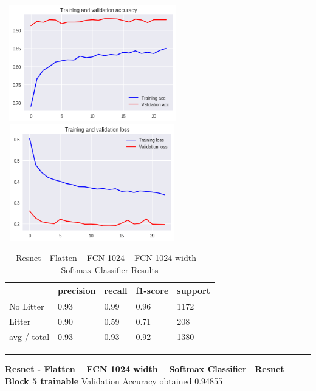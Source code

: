 \documentclass{IEEEtran}
\begin{document}
 \includegraphics[width=3in,height=2in]{resnet-img/resnet-img009.png} 
\includegraphics[width=3in,height=2in]{resnet-img/resnet-img010.png} 


\bigskip

\begin{table}[ht]
\centering
\caption{Resnet - Flatten -- FCN 1024 -- FCN 1024 width -- Softmax Classifier Results}
\begin{tabular}{|l|l|l|l|l|} 
\hline
 & precision & recall  & f1-score  & support \\\hline
No Litter  &
0.93  &
0.99  &
0.96  &
1172 \\\hline
Litter  &
0.90  &
0.59  &
0.71  &
208 \\\hline
avg / total  &
0.93  &
0.93  &
0.92  &
1380\\\hline
\end{tabular}
\end{table}

\begin{center}\noindent\rule{8cm}{0.4pt}\end{center}


\bigskip

\textbf{Resnet - Flatten -- FCN 1024 width -- Softmax Classifier \ Resnet Block 5 trainable}
Validation Accuracy obtained 0.94855


\bigskip
\end{document}
